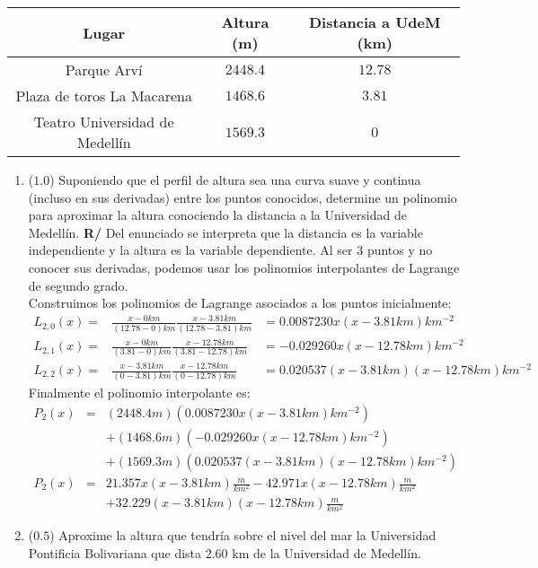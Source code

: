 \documentclass[12pt]{article}
\begin{document}
\begin{enumerate}[leftmargin=*,widest=9]
    \begin{center}
    \begin{tabular}{|c|c|c|}
    \hline
    Lugar & Altura (m) & Distancia a UdeM (km) \\
    \hline
    Parque Arví & \(2448.4\) & \(12.78\) \\
    Plaza de toros La Macarena & \(1468.6\) & \(3.81\) \\
    Teatro Universidad de Medellín & \(1569.3\) & \(0\) \\
    \hline
    \end{tabular}
    \end{center}
    \begin{enumerate}[label=\alph*]
    \item (\(1.0\)) Suponiendo que el perfil de altura sea una curva suave y continua (incluso en sus derivadas) entre los puntos conocidos, determine un polinomio para aproximar la altura conociendo la distancia a la Universidad de Medellín.
\textbf{R/} Del enunciado se interpreta que la distancia es la variable independiente y la altura es la variable dependiente. Al ser 3 puntos y no conocer sus derivadas, podemos usar los polinomios interpolantes de Lagrange de segundo grado.\\
Construimos los polinomios de Lagrange asociados a los puntos inicialmente:
\begin{eqnarray*}
L_{2,0}(x) = & \frac{x-0km}{(12.78 -0)km}\frac{x-3.81km}{(12.78 - 3.81)km} &= 0.0087230x(x-3.81km)km^{-2}\\
L_{2,1}(x) = & \frac{x-0km}{(3.81 - 0)km}\frac{x-12.78km}{(3.81 - 12.78)km} & = -0.029260x(x-12.78km)km^{-2}\\
L_{2,2}(x) = & \frac{x-3.81 km}{(0-3.81)km} \frac{x-12.78km}{(0-12.78)km} & = 0.020537(x-3.81km)(x-12.78km)km^{-2}
\end{eqnarray*}
Finalmente el polinomio interpolante es:
\begin{eqnarray*}
P_2(x) & = &(2448.4m)(0.0087230x(x-3.81km)km^{-2}) \\
& &+ (1468.6m)(-0.029260x(x-12.78km)km^{-2})\\
& &+ (1569.3m)(0.020537(x-3.81km)(x-12.78km)km^{-2})\\
P_2(x) & =& 21.357x(x-3.81km)\frac{m}{km^2} - 42.971x(x-12.78km)\frac{m}{km^2}\\
&&+32.229(x-3.81km)(x-12.78km)\frac{m}{km^2}
\end{eqnarray*}
    \item (\(0.5\)) Aproxime la altura que tendría sobre el nivel del mar la Universidad Pontificia Bolivariana que dista \(2.60\) km de la Universidad de Medellín. %

\end{enumerate}
\end{enumerate}
\end{document}
